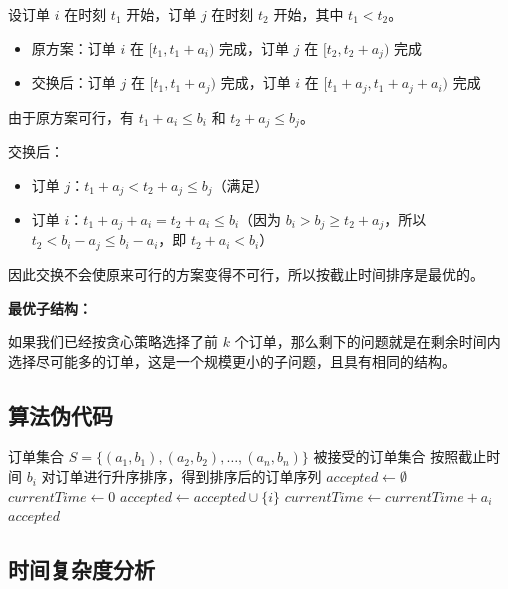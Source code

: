 \documentclass[UTF8,12pt,a4paper]{ctexart}
\begin{document}
设订单 $i$ 在时刻 $t_1$ 开始，订单 $j$ 在时刻 $t_2$ 开始，其中 $t_1 < t_2$。
\begin{itemize}
	\item 原方案：订单 $i$ 在 $[t_1, t_1+a_i)$ 完成，订单 $j$ 在 $[t_2, t_2+a_j)$ 完成
	\item 交换后：订单 $j$ 在 $[t_1, t_1+a_j)$ 完成，订单 $i$ 在 $[t_1+a_j, t_1+a_j+a_i)$ 完成
\end{itemize}

由于原方案可行，有 $t_1 + a_i \leq b_i$ 和 $t_2 + a_j \leq b_j$。

交换后：
\begin{itemize}
	\item 订单 $j$：$t_1 + a_j < t_2 + a_j \leq b_j$（满足）
	\item 订单 $i$：$t_1 + a_j + a_i = t_2 + a_i \leq b_i$（因为 $b_i > b_j \geq t_2 + a_j$，所以 $t_2 < b_i - a_j \leq b_i - a_i$，即 $t_2 + a_i < b_i$）
\end{itemize}

因此交换不会使原来可行的方案变得不可行，所以按截止时间排序是最优的。

\textbf{最优子结构：}

如果我们已经按贪心策略选择了前 $k$ 个订单，那么剩下的问题就是在剩余时间内选择尽可能多的订单，这是一个规模更小的子问题，且具有相同的结构。

\subsection*{算法伪代码}

\begin{algorithm}[H]
	\caption{订单调度贪心算法}
	\begin{algorithmic}[1]
		\Require 订单集合 $S = \{(a_1, b_1), (a_2, b_2), \ldots, (a_n, b_n)\}$
		\Ensure 被接受的订单集合
		\State 按照截止时间 $b_i$ 对订单进行升序排序，得到排序后的订单序列
		\State $accepted \gets \emptyset$ 
		\State $currentTime \gets 0$ 
			 
				\State $accepted \gets accepted \cup \{i\}$
				\State $currentTime \gets currentTime + a_i$
			\EndIf
		\EndFor
		\State \Return $accepted$
	\end{algorithmic}
\end{algorithm}

\subsection*{时间复杂度分析}
\end{document}
